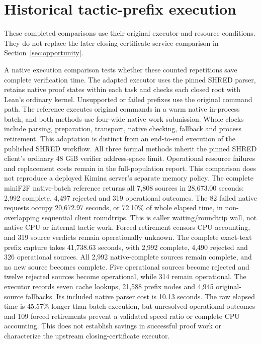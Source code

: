 \documentclass[10pt,twocolumn]{article}
\begin{document}
\section{Historical tactic-prefix execution}\label{app:prefix-history}
These completed comparisons use their original executor and resource conditions. They do not replace the later closing-certificate service comparison in Section~\ref{sec:opportunity}.

A native execution comparison tests whether these counted repetitions save
complete verification time. The adapted executor uses the pinned SHRED parser,
retains native proof states within each task and checks each closed root with
Lean's ordinary kernel. Unsupported or failed prefixes use the original
command path. The reference executes original commands in a warm native
in-process batch, and both methods use four-wide native work submission.
Whole clocks include parsing, preparation, transport, native checking,
fallback and process retirement. This adaptation is distinct from an
end-to-end execution of the published SHRED workflow. All three formal methods
inherit the pinned SHRED client's ordinary 48 GiB verifier address-space
limit. Operational resource failures and replacement costs remain in the
full-population report. This comparison does not reproduce a deployed
Kimina server's separate memory policy.
The complete miniF2F native-batch reference returns all 7,808 sources in
28,673.00 seconds: 2,992 complete, 4,497 rejected and 319 operational outcomes.
The 82 failed native requests occupy 20,672.97 seconds, or 72.10\% of whole
elapsed time, in non-overlapping sequential client roundtrips. This is
caller waiting/roundtrip wall, not native CPU or internal tactic work.
Forced retirement censors CPU accounting, and 319 source verdicts remain
operationally unknown.
The complete exact-text prefix capture takes 41,738.63 seconds, with
2,992 complete, 4,490 rejected and 326 operational sources.
All 2,992 native-complete sources remain complete, and no new source becomes
complete. Five operational sources become rejected and twelve rejected
sources become operational, while 314 remain operational.
The executor records seven cache lookups, 21,588 prefix nodes and 4,945
original-source fallbacks. Its included native parser cost is 10.13 seconds.
The raw elapsed time is 45.57\% longer than batch execution, but unresolved
operational outcomes and 109 forced retirements prevent a validated
speed ratio or complete CPU accounting. This does not establish savings in
successful proof work or characterize the upstream closing-certificate executor.
\end{document}
